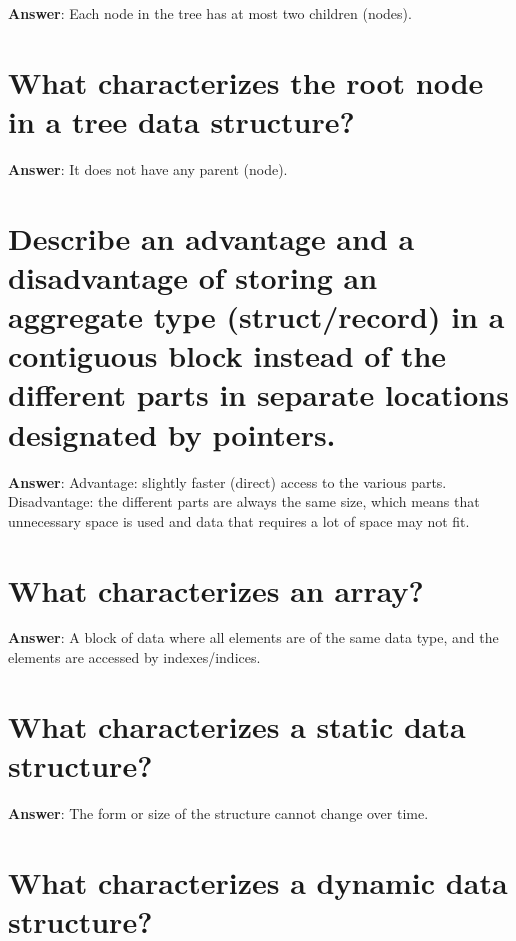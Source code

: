\documentclass[a4paper,11pt,oneside]{book}
\begin{document}
\begin{sloppypar}
\label{q:270:sa:en:True}

\textbf{Answer}: Each node in the tree has at most two children (nodes).



\section{What characterizes the root node in a tree data structure?}

\label{q:271:sa:en:True}

\textbf{Answer}: It does not have any parent (node).



\section{Describe an advantage and a disadvantage of storing an aggregate type (struct/record) in a contiguous block instead of the different parts in separate locations designated by pointers.}

\label{q:272:sa:en:True}

\textbf{Answer}: Advantage: slightly faster (direct) access to the various parts. Disadvantage: the different parts are always the same size, which means that unnecessary space is used and data that requires a lot of space may not fit.



\section{What characterizes an array?}

\label{q:273:sa:en:True}

\textbf{Answer}: A block of data where all elements are of the same data type, and the elements are accessed by indexes/indices.



\section{What characterizes a static data structure?}

\label{q:274:sa:en:True}

\textbf{Answer}: The form or size of the structure cannot change over time.



\section{What characterizes a dynamic data structure?}


\end{sloppypar}
\end{document}
